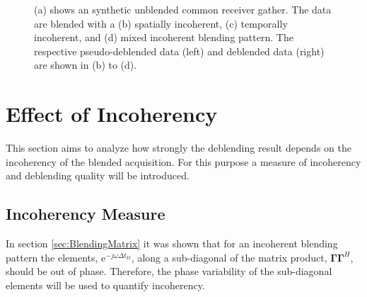 \begin{figure}
	\caption{(a) shows an synthetic unblended common receiver gather. The data are blended with a (b) spatially incoherent, (c) temporally incoherent, and (d) mixed incoherent blending pattern. The respective pseudo-deblended data (left) and deblended data (right) are shown in (b) to (d).}
	\label{fig:Ch-Results-Debl-x-inline}

\end{figure}


\FloatBarrier
\section{Effect of Incoherency} \label{sec:Effect-of-Incoherency}

This section aims to analyze how strongly the deblending result depends on the incoherency of the blended acquisition. For this purpose a measure of incoherency and deblending quality will be introduced.

\subsection*{Incoherency Measure}



In section \ref{sec:BlendingMatrix} it was shown that for an incoherent blending pattern the elements, $\mathrm{e}^{-j \omega \Delta t_{kl}}$, along a sub-diagonal of the matrix product, $\mathbf{\Gamma \Gamma}^H$, should be out of phase. Therefore, the phase variability of the sub-diagonal elements will be used to quantify incoherency. 

